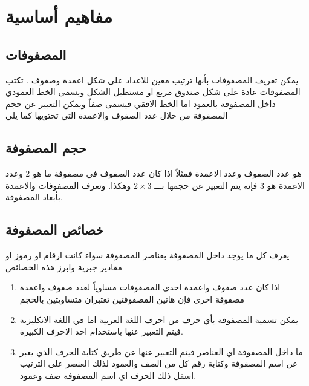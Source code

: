 \chapter{مفاهيم أساسية}

\section*{المصفوفات}
يمكن تعريف المصفوفات بأنها ترتيب معين للاعداد على شكل اعمدة وصفوف . تكتب المصفوفات عادة على شكل صندوق مربع او مستطيل الشكل ويسمى الخط العمودي داخل المصفوفة بالعمود اما الخط الافقي فيسمى صفاً ويمكن التعبير عن حجم المصفوفة من خلال عدد الصفوف والاعمدة التي تحتويها كما يلي

\section*{حجم المصفوفة}
هو عدد الصفوف وعدد الاعمدة فمثلاً اذا كان عدد الصفوف في مصفوفة ما هو 2 وعدد الاعمدة هو 3 فإنه يتم التعبير عن حجمها بـــ $2\times3$ وهكذا. وتعرف المصفوفات والاعمدة بأبعاد المصفوفة.

\section*{خصائص المصفوفة}
يعرف كل ما يوجد داخل المصفوفة بعناصر المصفوفة سواء كانت ارقام او رموز او مقادير جبرية وابرز هذه الخصائص
\begin{enumerate}
	\item اذا كان عدد صفوف واعمدة احدى المصفوفات مساوياً لعدد صفوف واعمدة مصفوفة اخرى فإن هاتين المصفوفتين تعتبران متساويتين بالحجم 
	\item يمكن تسمية المصفوفة بأي حرف من احرف اللغة العربية اما في اللغة الانكليزية فيتم التعبير عنها باستخدام احد الاحرف الكبيرة.
	\item ما داخل المصفوفة اي العناصر فيتم التعبير عنها عن طريق كتابة الحرف الذي يعبر عن اسم المصفوفة وكتابة رقم كل من الصف والعمود لذلك العنصر على الترتيب اسفل ذلك الحرف اي اسم المصفوفة صف وعمود.
\end{enumerate}

